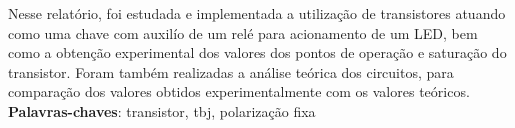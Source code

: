 \setlength{\absparsep}{18pt} %
 \begin{resumo}
Nesse relatório, foi estudada e implementada a utilização de transistores atuando como uma chave com auxilío de um relé para acionamento de um LED, bem como a obtenção experimental dos valores dos pontos de operação e saturação do transistor. Foram também realizadas a análise teórica dos circuitos, para comparação dos valores obtidos experimentalmente com os valores teóricos.\\
 \noindent
 \textbf{Palavras-chaves}: transistor, tbj, polarização fixa
\end{resumo} 